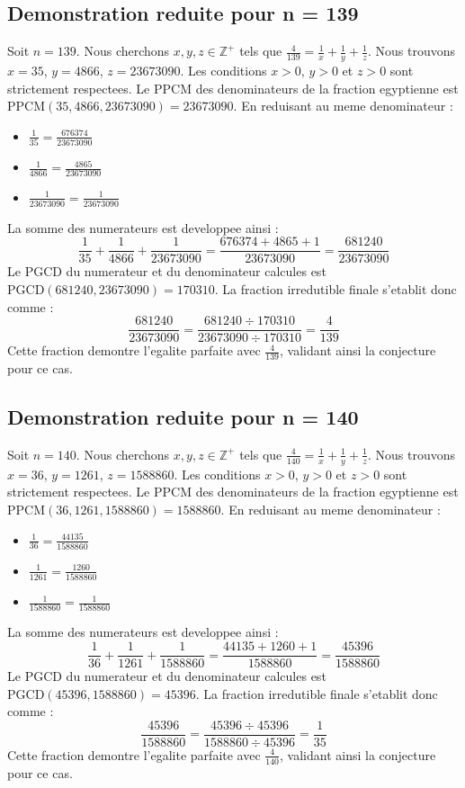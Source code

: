 \documentclass[11pt,a4paper]{article}
\begin{document}
\subsection{Demonstration reduite pour n = 139}
Soit $n = 139$. Nous cherchons $x, y, z \in \mathbb{Z}^{+}$ tels que $\frac{4}{139} = \frac{1}{x} + \frac{1}{y} + \frac{1}{z}$.
Nous trouvons $x = 35$, $y = 4866$, $z = 23673090$.
Les conditions $x > 0$, $y > 0$ et $z > 0$ sont strictement respectees.
Le PPCM des denominateurs de la fraction egyptienne est $\text{PPCM}(35, 4866, 23673090) = 23673090$.
En reduisant au meme denominateur :
\begin{itemize}
    \item $\frac{1}{35} = \frac{676374}{23673090}$
    \item $\frac{1}{4866} = \frac{4865}{23673090}$
    \item $\frac{1}{23673090} = \frac{1}{23673090}$
\end{itemize}
La somme des numerateurs est developpee ainsi :
$$ \frac{1}{35} + \frac{1}{4866} + \frac{1}{23673090} = \frac{676374 + 4865 + 1}{23673090} = \frac{681240}{23673090} $$
Le PGCD du numerateur et du denominateur calcules est $\text{PGCD}(681240, 23673090) = 170310$.
La fraction irredutible finale s'etablit donc comme :
$$ \frac{681240}{23673090} = \frac{681240 \div 170310}{23673090 \div 170310} = \frac{4}{139} $$
Cette fraction demontre l'egalite parfaite avec $\frac{4}{139}$, validant ainsi la conjecture pour ce cas.

\subsection{Demonstration reduite pour n = 140}
Soit $n = 140$. Nous cherchons $x, y, z \in \mathbb{Z}^{+}$ tels que $\frac{4}{140} = \frac{1}{x} + \frac{1}{y} + \frac{1}{z}$.
Nous trouvons $x = 36$, $y = 1261$, $z = 1588860$.
Les conditions $x > 0$, $y > 0$ et $z > 0$ sont strictement respectees.
Le PPCM des denominateurs de la fraction egyptienne est $\text{PPCM}(36, 1261, 1588860) = 1588860$.
En reduisant au meme denominateur :
\begin{itemize}
    \item $\frac{1}{36} = \frac{44135}{1588860}$
    \item $\frac{1}{1261} = \frac{1260}{1588860}$
    \item $\frac{1}{1588860} = \frac{1}{1588860}$
\end{itemize}
La somme des numerateurs est developpee ainsi :
$$ \frac{1}{36} + \frac{1}{1261} + \frac{1}{1588860} = \frac{44135 + 1260 + 1}{1588860} = \frac{45396}{1588860} $$
Le PGCD du numerateur et du denominateur calcules est $\text{PGCD}(45396, 1588860) = 45396$.
La fraction irredutible finale s'etablit donc comme :
$$ \frac{45396}{1588860} = \frac{45396 \div 45396}{1588860 \div 45396} = \frac{1}{35} $$
Cette fraction demontre l'egalite parfaite avec $\frac{4}{140}$, validant ainsi la conjecture pour ce cas.
\end{document}
